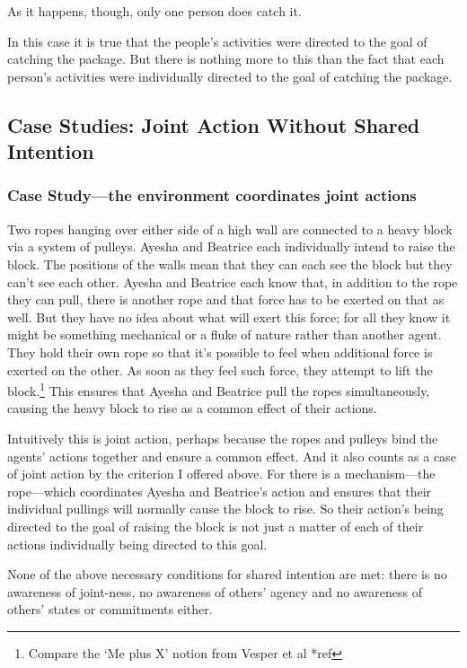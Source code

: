\documentclass[12pt,a4paper]{extarticle}
\begin{document}
As it happens, though, only one person does catch it.

In this case it is true that the people's activities were directed to the goal of catching the package.  But there is nothing more to this than the fact that each person's activities were individually directed to the goal of catching the package.



\subsection{Case Studies: Joint Action Without Shared Intention}


\subsubsection{Case Study---the environment coordinates joint actions}

Two ropes hanging over either side of a high wall are connected to a heavy block via a system of pulleys.  Ayesha and Beatrice each individually intend to raise the block.  
The positions of the walls mean that they can each see the block but they can't see each other.
Ayesha and Beatrice each know that, in addition to the rope they can pull, there is another rope and that force has to be exerted on that as well.  
But they have no idea about what will exert this force; for all they know it might be something mechanical or a fluke of nature rather than another agent.
They hold their own rope so that it's possible to feel when additional force is exerted on the other.  As soon as they feel such force, they attempt to lift the block.\footnote{
Compare the `Me plus X' notion from Vesper et al *ref
} 
This ensures that Ayesha and Beatrice pull the ropes simultaneously, causing the heavy block to rise as a common effect of their actions. 

Intuitively this is joint action, perhaps because the ropes and pulleys bind the agents' actions together and ensure a common effect.  And it also counts as a case of joint action by the criterion I offered above.  For there is a mechanism---the rope---which coordinates Ayesha and Beatrice's action and ensures that their individual pullings will normally cause the block to rise.  So their action's being directed to the goal of raising the block is not just a matter of each of their actions individually being directed to this goal.  

None of the above necessary conditions for shared intention are met: there is no awareness of joint-ness, no awareness of others' agency and no awareness of others' states or commitments either.  
\end{document}
